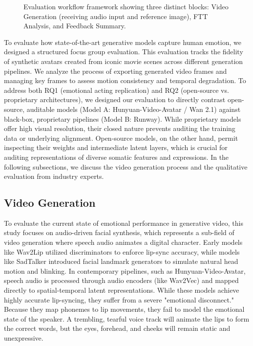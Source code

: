 \documentclass[pdflatex,sn-mathphys-num]{sn-jnl}
\theoremstyle{thmstyleone}
\theoremstyle{thmstyletwo}
\theoremstyle{thmstylethree}
\begin{document}
\begin{figure}[ht!]
{
  }
  \caption{Evaluation workflow framework showing three distinct blocks: Video Generation (receiving audio input and reference image), FTT Analysis, and Feedback Summary.}
  \label{fig:audio_generation_pipeline}
\end{figure}To evaluate how state-of-the-art generative models capture human emotion, we designed a structured focus group evaluation. This evaluation tracks the fidelity of synthetic avatars created from iconic movie scenes across different generation pipelines. We analyze the process of exporting generated video frames and managing key frames to assess motion consistency and temporal degradation. To address both RQ1 (emotional acting replication) and RQ2 (open-source vs. proprietary architectures), we designed our evaluation to directly contrast open-source, auditable models (Model A: Hunyuan-Video-Avatar / Wan 2.1) against black-box, proprietary pipelines (Model B: Runway). While proprietary models offer high visual resolution, their closed nature prevents auditing the training data or underlying alignment. Open-source models, on the other hand, permit inspecting their weights and intermediate latent layers, which is crucial for auditing representations of diverse somatic features and expressions. In the following subsections, we discuss the video generation process and the qualitative evaluation from industry experts.

\subsection{Video Generation}\label{subsec:video_generation}

To evaluate the current state of emotional performance in generative video, this study focuses on audio-driven facial synthesis, which represents a sub-field of video generation where speech audio animates a digital character. Early models like Wav2Lip utilized discriminators to enforce lip-sync accuracy, while models like SadTalker introduced facial landmark generators to simulate natural head motion and blinking. In contemporary pipelines, such as Hunyuan-Video-Avatar, speech audio is processed through audio encoders (like Wav2Vec) and mapped directly to spatial-temporal latent representations. While these models achieve highly accurate lip-syncing, they suffer from a severe "emotional disconnect." Because they map phonemes to lip movements, they fail to model the emotional state of the speaker. A trembling, tearful voice track will animate the lips to form the correct words, but the eyes, forehead, and cheeks will remain static and unexpressive.
\end{document}

